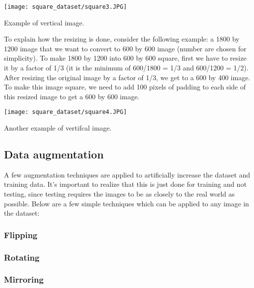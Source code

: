 \begin{marginfigure} %
	\texttt{[image: square\_dataset/square3.JPG]}
	\caption{Example of vertical image.}
\end{marginfigure}

To explain how the resizing is done, consider the following example: a 1800 by 1200 image that we want to convert to 600 by 600 image (number are chosen for simplicity). To make 1800 by 1200 into 600 by 600 square, first we have to resize it by a factor of 1/3 (it is the minimum of 600/1800 = 1/3 and 600/1200 = 1/2). After resizing the original image by a factor of 1/3, we get to a 600 by 400 image. To make this image square, we need to add 100 pixels of padding to each side of this resized image to get a 600 by 600 image.


\begin{marginfigure} %
	\texttt{[image: square\_dataset/square4.JPG]}
	\caption{Another example of vertifcal image.}
\end{marginfigure}


\subsection{Data augmentation}
A few augmentation techniques are applied to artificially increase the dataset and training data. 
It's important to realize that this is just done for training and not testing, 
since testing requires the images to be as closely to the real world as possible. 
Below are a few simple techniques which can be applied to any image in the dataset:

\subsubsection{Flipping}
\subsubsection{Rotating}
\subsubsection{Mirroring}
